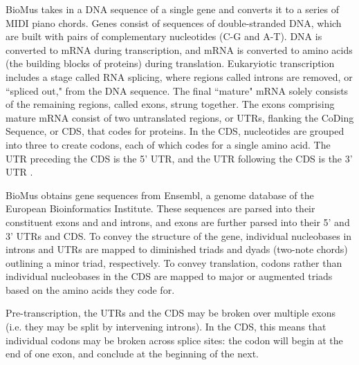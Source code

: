 \documentclass[letterpaper]{article}
\begin{document}
BioMus takes in a DNA sequence of a single gene and converts it to a series of MIDI piano chords. Genes consist of sequences of double-stranded DNA, 
which are built with pairs of complementary nucleotides (C-G and A-T). 
DNA is converted to mRNA during transcription, and mRNA is converted to amino acids (the building blocks of proteins) during translation. Eukaryiotic transcription includes a stage called RNA splicing, where regions called introns are removed, or ``spliced out," from the DNA sequence. The final ``mature" mRNA solely consists of the remaining regions, called exons, strung together. The exons comprising mature mRNA consist of two untranslated regions, or UTRs, flanking the CoDing Sequence, or CDS, that codes for proteins. 
In the CDS, nucleotides are grouped into three to create codons, each of which codes for a single amino acid. The UTR preceding the CDS is the 5' UTR, and the UTR following the CDS is the 3' UTR \cite{khan_academy_2016}.

BioMus obtains gene sequences from Ensembl, a genome database of the European Bioinformatics Institute. These sequences are parsed into their constituent exons and and introns, and exons are further parsed into their 5' and 3' UTRs and CDS. To convey the structure of the gene, individual nucleobases in introns and UTRs are mapped to diminished triads and dyads (two-note chords) outlining a minor triad, respectively. To convey translation, codons rather than individual nucleobases in the CDS are mapped to major or augmented triads based on the amino acids they code for. 

Pre-transcription, the UTRs and the CDS may be broken over multiple exons (i.e. they may be split by intervening introns). In the CDS, this means that individual codons may be broken across splice sites: the codon will begin at the end of one exon, and conclude at the beginning of the next. 
\end{document}
